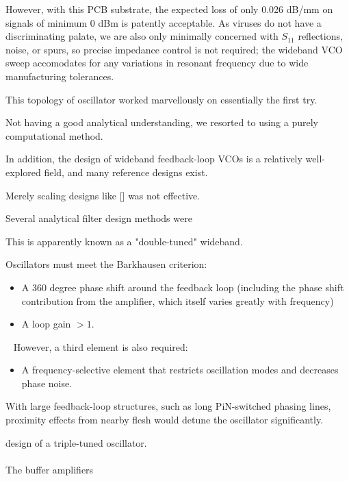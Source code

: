 \documentclass[paper.tex]{subfiles}
\begin{document}
However, with this PCB substrate, the expected loss of only 0.026 dB/mm on signals of minimum 0 dBm is patently acceptable. As viruses do not have a discriminating palate, we are also only minimally concerned with $S_{11}$ reflections, noise, or spurs, so precise impedance control is not required; the wideband VCO sweep accomodates for any variations in resonant frequency due to wide manufacturing tolerances.


This topology of oscillator worked marvellously on essentially the first try.

Not having a good analytical understanding, we resorted to using a purely computational method.

In addition, the design of wideband feedback-loop VCOs is a relatively well-explored field, and many reference designs exist. 

Merely scaling designs like [] was not effective.





Several analytical filter design methods were 

This is apparently known as a "double-tuned" wideband.


Oscillators must meet the Barkhausen criterion:

\begin{itemize}

\item A 360 degree phase shift around the feedback loop (including the phase shift contribution from the amplifier, which itself varies greatly with frequency)
\item A loop gain $>1.$ 

\end{itemize}\
%
However, a third element is also required:
%
\begin{itemize}
\item A frequency-selective element that restricts oscillation modes and decreases phase noise.
\end{itemize}
%

With large feedback-loop structures, such as long PiN-switched phasing lines, proximity effects from nearby flesh would detune the oscillator significantly.

 design of a triple-tuned oscillator.


\paragraph{}
The buffer amplifiers 
\end{document}
